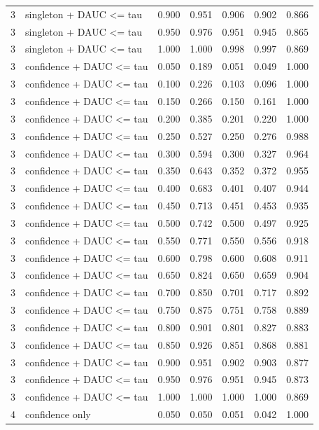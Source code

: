 \begin{tabular}{rlrrrrr}
3 & singleton + DAUC <= tau & 0.900 & 0.951 & 0.906 & 0.902 & 0.866 \\
3 & singleton + DAUC <= tau & 0.950 & 0.976 & 0.951 & 0.945 & 0.865 \\
3 & singleton + DAUC <= tau & 1.000 & 1.000 & 0.998 & 0.997 & 0.869 \\
3 & confidence + DAUC <= tau & 0.050 & 0.189 & 0.051 & 0.049 & 1.000 \\
3 & confidence + DAUC <= tau & 0.100 & 0.226 & 0.103 & 0.096 & 1.000 \\
3 & confidence + DAUC <= tau & 0.150 & 0.266 & 0.150 & 0.161 & 1.000 \\
3 & confidence + DAUC <= tau & 0.200 & 0.385 & 0.201 & 0.220 & 1.000 \\
3 & confidence + DAUC <= tau & 0.250 & 0.527 & 0.250 & 0.276 & 0.988 \\
3 & confidence + DAUC <= tau & 0.300 & 0.594 & 0.300 & 0.327 & 0.964 \\
3 & confidence + DAUC <= tau & 0.350 & 0.643 & 0.352 & 0.372 & 0.955 \\
3 & confidence + DAUC <= tau & 0.400 & 0.683 & 0.401 & 0.407 & 0.944 \\
3 & confidence + DAUC <= tau & 0.450 & 0.713 & 0.451 & 0.453 & 0.935 \\
3 & confidence + DAUC <= tau & 0.500 & 0.742 & 0.500 & 0.497 & 0.925 \\
3 & confidence + DAUC <= tau & 0.550 & 0.771 & 0.550 & 0.556 & 0.918 \\
3 & confidence + DAUC <= tau & 0.600 & 0.798 & 0.600 & 0.608 & 0.911 \\
3 & confidence + DAUC <= tau & 0.650 & 0.824 & 0.650 & 0.659 & 0.904 \\
3 & confidence + DAUC <= tau & 0.700 & 0.850 & 0.701 & 0.717 & 0.892 \\
3 & confidence + DAUC <= tau & 0.750 & 0.875 & 0.751 & 0.758 & 0.889 \\
3 & confidence + DAUC <= tau & 0.800 & 0.901 & 0.801 & 0.827 & 0.883 \\
3 & confidence + DAUC <= tau & 0.850 & 0.926 & 0.851 & 0.868 & 0.881 \\
3 & confidence + DAUC <= tau & 0.900 & 0.951 & 0.902 & 0.903 & 0.877 \\
3 & confidence + DAUC <= tau & 0.950 & 0.976 & 0.951 & 0.945 & 0.873 \\
3 & confidence + DAUC <= tau & 1.000 & 1.000 & 1.000 & 1.000 & 0.869 \\
4 & confidence only & 0.050 & 0.050 & 0.051 & 0.042 & 1.000 \\

\end{tabular}
